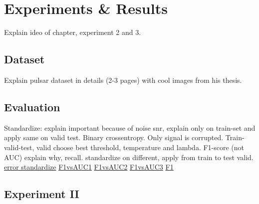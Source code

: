 \chapter{Experiments \& Results} 
\label{chapter-6} 

Explain ideo of chapter, experiment 2 and 3.


\section{Dataset}

Explain pulsar dataset in details (2-3 pages) with cool images from his thesis. 


\section{Evaluation}

Standardize: explain important because of noise snr, explain only on train-set and apply same on valid test. Binary crossentropy. Only signal is corrupted. Train-valid-test, valid choose best threshold, temperature and lambda. F1-score (not AUC) explain why, recall. standardize on different, apply from train to test valid. 
\href{https://stats.stackexchange.com/questions/327294/data-standardization-for-training-and-testing-sets-for-different-scenarios}{error standardize}
\href{https://stats.stackexchange.com/questions/210700/how-to-choose-between-roc-auc-and-f1-score}{F1vsAUC1}
\href{https://www.quora.com/What-does-it-mean-to-have-high-AUC-but-low-F1-score}{F1vsAUC2}
\href{https://stackoverflow.com/questions/44172162/f1-score-vs-roc-auc}{F1vsAUC3}
\href{https://www.mikulskibartosz.name/f1-score-explained/}{F1}


\section{Experiment II}

